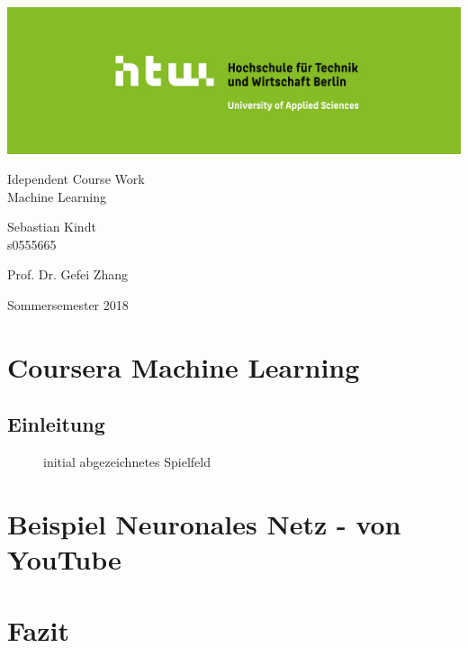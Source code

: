 \documentclass[11pt,a4paper,oldfontcommands,openany]{memoir}
\begin{document}
    
    
    {%
    \sffamily
    \centering
    \Large
    
    ~\vspace{\fill}
    \includegraphics[scale=0.4]{htw}
    
    {\huge 
    Idependent Course Work \\
    Machine Learning \\
    }
    
    \vspace{2.5cm}
    
    {\LARGE
    Sebastian Kindt\\
    s0555665
    }
    
    \vspace{3.5cm}
    
    Prof. Dr. Gefei Zhang
    
    \vspace{\fill}
    
    Sommersemester 2018
    
    }
    \newpage
    \tableofcontents
    \newpage
    
    \chapter{Coursera Machine Learning} 
    
    \section{Einleitung}
    
    \begin{figure}
    \centering
    \caption{\label{fig:game_field}initial abgezeichnetes Spielfeld}
    \end{figure}
    
    \chapter{Beispiel Neuronales Netz - von YouTube}
    
    \chapter{Fazit}
    
\end{document}
